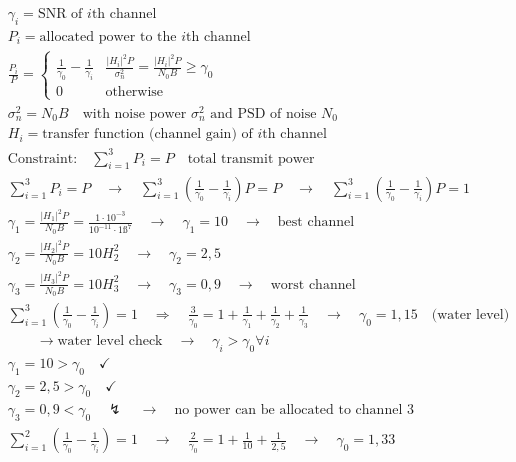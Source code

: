 \documentclass[fleqn]{article}
\begin{document}
\begin{align*}
	&\gamma_{i}=\text{SNR of $i$th channel}& \\
	&P_{i}=\text{allocated power to the $i$th channel}& \\
	&\frac{P_{i}}{P}=
	\begin{cases}
	\frac{1}{\gamma_{0}}-\frac{1}{\gamma_{i}} & \frac{\left|H_{i}\right|^{2}P}{\sigma_{n}^{2}}=\frac{\left|H_{i}\right|^{2}P}{N_{0}B}\ge\gamma_{0} \\
	0 & \text{otherwise}
	\end{cases}& \\
	&\sigma_{n}^{2}=N_{0}B\quad\text{with noise power $\sigma_{n}^{2}$ and PSD of noise $N_{0}$}& \\
	&H_{i}=\text{transfer function (channel gain) of $i$th channel}& \\
	&\text{Constraint:}\quad\sum_{i=1}^{3}P_{i}=P\quad\text{total transmit power}& \\
	&\sum_{i=1}^{3}P_{i}=P\quad\rightarrow\quad\sum_{i=1}^{3}\left(\frac{1}{\gamma_{0}}-\frac{1}{\gamma_{i}}\right)P=P\quad\rightarrow\quad\boxed{\sum_{i=1}^{3}\left(\frac{1}{\gamma_{0}}-\frac{1}{\gamma_{i}}\right)P=1}& \\
	&\gamma_{1}=\frac{\left|H_{1}\right|^{2}P}{N_{0}B}=\frac{1\cdot 10^{-3}}{10^{-11}\cdot 1ß^{7}}\quad\rightarrow\quad\gamma_{1}=10\quad\rightarrow\quad\text{best channel}& \\
	&\gamma_{2}=\frac{\left|H_{2}\right|^{2}P}{N_{0}B}=10H_{2}^{2}\quad\rightarrow\quad\gamma_{2}=2,5& \\
	&\gamma_{3}=\frac{\left|H_{3}\right|^{2}P}{N_{0}B}=10H_{3}^{2}\quad\rightarrow\quad\gamma_{3}=0,9\quad\rightarrow\quad\text{worst channel}& \\
	&\sum_{i=1}^{3}\left(\frac{1}{\gamma_{0}}-\frac{1}{\gamma_{i}}\right)=1\quad\Rightarrow\quad\frac{3}{\gamma_{0}}=1+\frac{1}{\gamma_{1}}+\frac{1}{\gamma_{2}}+\frac{1}{\gamma_{3}}\quad\rightarrow\quad\gamma_{0}=1,15\quad\text{(water level)}& \\
	&\qquad\rightarrow\text{water level check}\quad\rightarrow\quad\gamma_{i}>\gamma_{0}\forall i& \\
	&\gamma_{1}=10>\gamma_{0}\quad\checkmark& \\
	&\gamma_{2}=2,5>\gamma_{0}\quad\checkmark& \\
	&\gamma_{3}=0,9<\gamma_{0}\quad\lightning\quad\rightarrow\quad\text{no power can be allocated to channel 3}& \\
	&\sum_{i=1}^{2}\left(\frac{1}{\gamma_{0}}-\frac{1}{\gamma_{i}}\right)=1\quad\rightarrow\quad\frac{2}{\gamma_{0}}=1+\frac{1}{10}+\frac{1}{2,5}\quad\rightarrow\quad\gamma_{0}=1,33& \\

\end{align*}
\end{document}
